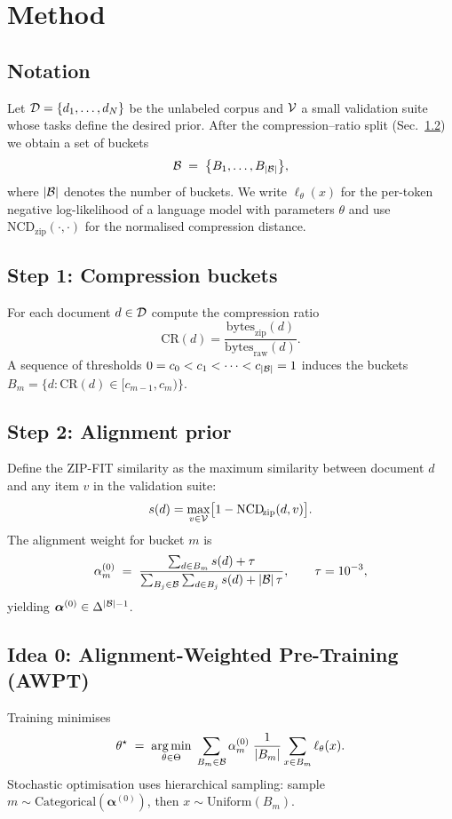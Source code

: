 \section{Method}\label{sec:method}

\subsection{Notation}\label{sec:notation}
Let $\mathcal{D}=\{d_1,\dots,d_N\}$ be the unlabeled corpus and $\mathcal{V}$ a small validation suite whose tasks define the desired prior.
After the compression–ratio split (Sec.~\ref{sec:buckets}) we obtain a set of buckets
\[
  \mathcal{B} \;=\;\bigl\{B_1,\dots,B_{\lvert\mathcal{B}\rvert}\bigr\},
\]
where $\lvert\mathcal{B}\rvert$ denotes the number of buckets.
We write $\ell_{\theta}(x)$ for the per-token negative log-likelihood of a language model with parameters $\theta$ and use $\mathrm{NCD}_{\!\mathrm{zip}}(\cdot,\cdot)$ for the normalised compression distance.

\subsection{Step 1: Compression buckets}\label{sec:buckets}
For each document $d\in\mathcal{D}$ compute the compression ratio
\begin{equation}
\mathrm{CR}(d)=
\frac{\text{bytes}_{\text{zip}}(d)}
     {\text{bytes}_{\text{raw}}(d)}.
\end{equation}
A sequence of thresholds $0=c_0<c_1<\dots<c_{\lvert\mathcal{B}\rvert}=1$ induces the buckets $B_m=\{d\!:\!\mathrm{CR}(d)\in[c_{m-1},c_m)\}$.

\subsection{Step 2: Alignment prior}\label{sec:prior}
Define the ZIP-FIT similarity as the maximum similarity between document $d$ and any item $v$ in the validation suite:
\[
  s(d)=\max_{v\in\mathcal{V}}\bigl[1-\mathrm{NCD}_{\!\mathrm{zip}}(d,v)\bigr].
\]
The alignment weight for bucket $m$ is
\begin{equation}\label{eq:alpha0-b}
\alpha^{(0)}_m \;=\;
\frac{\sum_{d\in B_m}s(d)+\tau}
     {\sum_{B_j\in\mathcal{B}}\sum_{d\in B_j}s(d)
      +\lvert\mathcal{B}\rvert\,\tau},
\qquad
\tau=10^{-3},
\end{equation}
yielding $\boldsymbol{\alpha}^{(0)}\in\Delta^{\lvert\mathcal{B}\rvert-1}$.

\subsection{Idea 0: Alignment-Weighted Pre-Training (AWPT)}
Training minimises
\begin{equation}\label{eq:awpt-final}
\theta^\star\;=\;
\operatorname*{arg\,min}_{\theta\in\Theta}\;
\sum_{B_m\in\mathcal{B}}
\alpha^{(0)}_m\;\frac{1}{\lvert B_m\rvert}
\sum_{x\in B_m} \ell_\theta(x).
\end{equation}
Stochastic optimisation uses hierarchical sampling: sample $m\!\sim\!\text{Categorical}(\boldsymbol{\alpha}^{(0)})$, then $x\!\sim\!\text{Uniform}(B_m)$.

